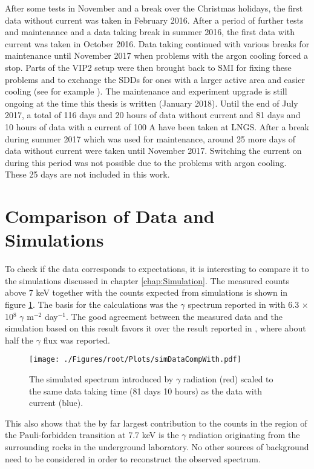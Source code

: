 After some tests in November and a break over the Christmas holidays, the first data without current was taken in February 2016. After a period of further tests and maintenance and a data taking break in summer 2016, the first data with current was taken in October 2016. Data taking continued with various breaks for maintenance until November 2017 when problems with the argon cooling forced a stop. Parts of the VIP2 setup were then brought back to SMI for fixing these problems and to exchange the SDDs for ones with a larger active area and easier cooling (see for example \cite{Pichler2017}). The maintenance and experiment upgrade is still ongoing at the time this thesis is written (January 2018). Until the end of July 2017, a total of 116 days and 20 hours of data without current and 81 days and 10 hours of data with a current of 100 A have been taken at LNGS. After a break during summer 2017 which was used for maintenance, around 25 more days of data without current were taken until November 2017. Switching the current on during this period was not possible due to the problems with argon cooling. These 25 days are not included in this work. 

\section{Comparison of Data and Simulations}
\label{sec:dataSimCompLngs}

To check if the data corresponds to expectations, it is interesting to compare it to the simulations discussed in chapter \ref{chap:Simulation}. The measured counts above 7 keV together with the counts expected from simulations is shown in figure \ref{fig:simDataLngs}. The basis for the calculations was the $\gamma$ spectrum reported in \cite{Bucci2009} with 6.3 $\times$ 10$^{8}$ $\gamma$ m$^{-2}$
day$^{-1}$. The good agreement between the measured data and the simulation based on this result favors it over the result reported in \cite{Haffke2011}, where about half the $\gamma$ flux was reported. 
\begin{figure}[h]
 \centering
 \texttt{[image: ./Figures/root/Plots/simDataCompWith.pdf]}
 \caption{The simulated spectrum introduced by $\gamma$ radiation (red) scaled to the same data taking time (81 days 10 hours) as the data with current (blue).}
 \label{fig:simDataLngs}
\end{figure}
This also shows that the by far largest contribution to the counts in the region of the Pauli-forbidden transition at 7.7 keV is the $\gamma$ radiation originating from the surrounding rocks in the underground laboratory. No other sources of background need to be considered in order to reconstruct the observed spectrum.

